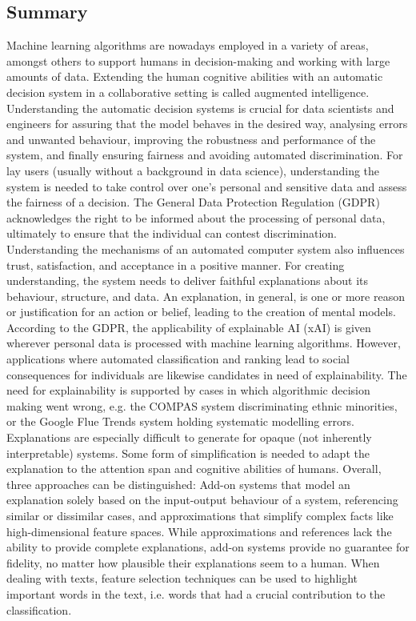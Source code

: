 \subsection{Summary}
Machine learning algorithms are nowadays employed in a variety of areas, amongst others to support humans in decision-making and working with large amounts of data. Extending the human cognitive abilities with an automatic decision system in a collaborative setting is called augmented intelligence. Understanding the automatic decision systems is crucial for data scientists and engineers for assuring that the model behaves in the desired way, analysing errors and unwanted behaviour, improving the robustness and performance of the system, and finally ensuring fairness and avoiding automated discrimination. For lay users (usually without a background in data science), understanding the system is needed to take control over one's personal and sensitive data and assess the fairness of a decision. The General Data Protection Regulation (GDPR) acknowledges the right to be informed about the processing of personal data, ultimately to ensure that the individual can contest discrimination. Understanding the mechanisms of an automated computer system also influences trust, satisfaction, and acceptance in a positive manner. For creating understanding, the system needs to deliver faithful explanations about its behaviour, structure, and data. An explanation, in general, is one or more reason or justification for an action or belief, leading to the creation of mental models.\newline
According to the GDPR, the applicability of explainable AI (xAI) is given wherever personal data is processed with machine learning algorithms. However, applications where automated classification and ranking lead to social consequences for individuals are likewise candidates in need of explainability. The need for explainability is supported by cases in which algorithmic decision making went wrong, e.g. the COMPAS system discriminating ethnic minorities, or the Google Flue Trends system holding systematic modelling errors. Explanations are especially difficult to generate for opaque (not inherently interpretable) systems. Some form of simplification is needed to adapt the explanation to the attention span and cognitive abilities of humans. Overall, three approaches can be distinguished: Add-on systems that model an explanation solely based on the input-output behaviour of a system, referencing similar or dissimilar cases, and approximations that simplify complex facts like high-dimensional feature spaces. While approximations and references lack the ability to provide complete explanations, add-on systems provide no guarantee for fidelity, no matter how plausible their explanations seem to a human. When dealing with texts, feature selection techniques can be used to highlight important words in the text, i.e. words that had a crucial contribution to the classification.\newline 
